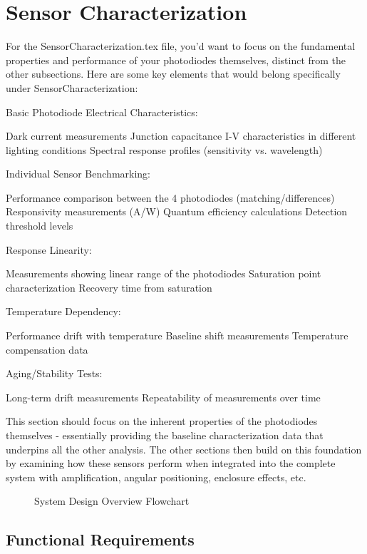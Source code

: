 \section{Sensor Characterization}
For the SensorCharacterization.tex file, you'd want to focus on the fundamental properties and performance of your photodiodes themselves, distinct from the other subsections. Here are some key elements that would belong specifically under SensorCharacterization:

Basic Photodiode Electrical Characteristics:

Dark current measurements
Junction capacitance
I-V characteristics in different lighting conditions
Spectral response profiles (sensitivity vs. wavelength)


Individual Sensor Benchmarking:

Performance comparison between the 4 photodiodes (matching/differences)
Responsivity measurements (A/W)
Quantum efficiency calculations
Detection threshold levels


Response Linearity:

Measurements showing linear range of the photodiodes
Saturation point characterization
Recovery time from saturation


Temperature Dependency:

Performance drift with temperature
Baseline shift measurements
Temperature compensation data


Aging/Stability Tests:

Long-term drift measurements
Repeatability of measurements over time



This section should focus on the inherent properties of the photodiodes themselves - essentially providing the baseline characterization data that underpins all the other analysis. The other sections then build on this foundation by examining how these sensors perform when integrated into the complete system with amplification, angular positioning, enclosure effects, etc.

\begin{figure}[H]
    \centering
    \scalebox{0.5}{ %
        
    }
    \caption{System Design Overview Flowchart}
    \label{fig:decriptiveLabel2} %
\end{figure}

\subsection{Functional Requirements}

